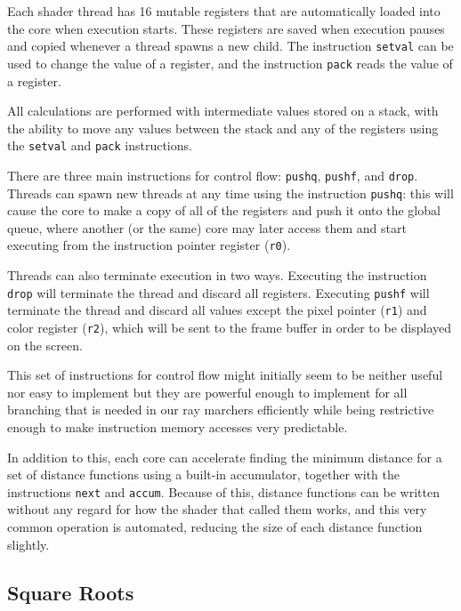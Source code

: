 			Each shader thread has 16 mutable registers that are automatically
			loaded into the core when execution starts. These registers are
			saved when execution pauses and copied whenever a thread spawns a 
			new child. The instruction \texttt{setval} can be used to change 
			the value of a register, and the instruction \texttt{pack} reads 
			the value of a register.

			All calculations are performed with intermediate values stored on a
			stack, with the ability to move any values between the stack and
			any of the registers using the \texttt{setval} and \texttt{pack}
			instructions.

			There are three main instructions for control flow: \texttt{pushq},
			\texttt{pushf}, and \texttt{drop}. Threads can spawn new threads at
			any time using the instruction \texttt{pushq}: this will cause the
			core to make a copy of all of the registers and push it onto the
			global queue, where another (or the same) core may later access
			them and start executing from the instruction pointer register
			(\texttt{r0}).

			Threads can also terminate execution in two ways. Executing the
			instruction \texttt{drop} will terminate the thread and discard all
			registers. Executing \texttt{pushf} will terminate the thread and
			discard all values except the pixel pointer (\texttt{r1}) and color
			register (\texttt{r2}), which will be sent to the frame buffer in
			order to be displayed on the screen.

			This set of instructions for control flow might initially seem to
			be neither useful nor easy to implement but they are powerful
			enough to implement for all branching that is needed in our ray
			marchers efficiently while being restrictive enough to make
			instruction memory accesses very predictable.

			In addition to this, each core can accelerate finding the minimum 
			distance for a set of distance functions using a built-in 
			accumulator, together with the instructions \texttt{next} and 
			\texttt{accum}. Because of this, distance functions can be written
			without any regard for how the shader that called them works, and
			this very common operation is automated, reducing the size of each
			distance function slightly.

		\subsection{Square Roots}

